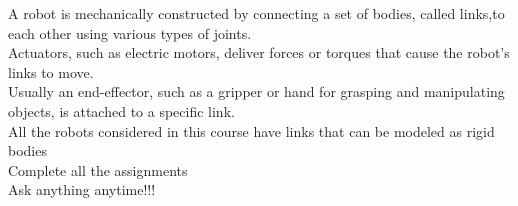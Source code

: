 \documentclass[preview]{standalone}
\begin{document}
A robot is mechanically constructed by connecting a set of bodies, called links,to each other using various types of joints.\\Actuators, such as electric motors, deliver forces or torques that cause the robot’s links to move.\\Usually an end-effector, such as a gripper or hand for grasping and manipulating objects, is attached to a specific link.\\All the robots considered in this course have links that can be modeled as rigid bodies\\Complete all the assignments\\Ask anything anytime!!!\\
\end{document}
